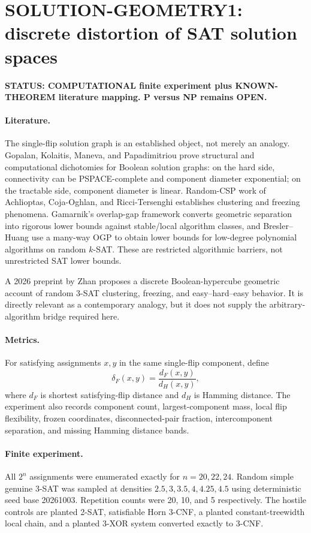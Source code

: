 \section*{SOLUTION-GEOMETRY1: discrete distortion of SAT solution spaces}

\textbf{STATUS: COMPUTATIONAL finite experiment plus KNOWN-THEOREM literature mapping. P versus NP remains OPEN.}

\paragraph{Literature.}
The single-flip solution graph is an established object, not merely an analogy. Gopalan,
Kolaitis, Maneva, and Papadimitriou prove structural and computational dichotomies for
Boolean solution graphs: on the hard side, connectivity can be PSPACE-complete and component
diameter exponential; on the tractable side, component diameter is linear. Random-CSP work
of Achlioptas, Coja-Oghlan, and Ricci-Tersenghi establishes clustering and freezing phenomena.
Gamarnik's overlap-gap framework converts geometric separation into rigorous lower bounds
against stable/local algorithm classes, and Bresler--Huang use a many-way OGP to obtain
lower bounds for low-degree polynomial algorithms on random $k$-SAT. These are restricted
algorithmic barriers, not unrestricted SAT lower bounds.

A 2026 preprint by Zhan proposes a discrete Boolean-hypercube geometric account of random
3-SAT clustering, freezing, and easy--hard--easy behavior. It is directly relevant as a
contemporary analogy, but it does not supply the arbitrary-algorithm bridge required here.

\paragraph{Metrics.}
For satisfying assignments $x,y$ in the same single-flip component, define
\[
\delta_F(x,y)=\frac{d_F(x,y)}{d_H(x,y)},
\]
where $d_F$ is shortest satisfying-flip distance and $d_H$ is Hamming distance. The experiment
also records component count, largest-component mass, local flip flexibility, frozen
coordinates, disconnected-pair fraction, intercomponent separation, and missing Hamming
distance bands.

\paragraph{Finite experiment.}
All $2^n$ assignments were enumerated exactly for $n=20,22,24$. Random simple genuine
3-SAT was sampled at densities $2.5,3,3.5,4,4.25,4.5$ using deterministic seed base
20261003. Repetition counts were 20, 10, and 5 respectively. The hostile controls are
planted 2-SAT, satisfiable Horn 3-CNF, a planted constant-treewidth local chain, and a planted
3-XOR system converted exactly to 3-CNF.

